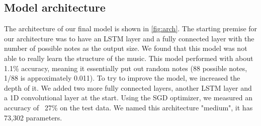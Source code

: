 \documentclass[11pt, twocolumn]{article}
\begin{document}
\subsection{Model architecture}\label{architecture}
The architecture of our final model is shown in \autoref{fig:arch}. The starting premise for our architecture was to have an LSTM layer and a fully connected layer with the number of possible notes as the output size. We found that this model was not able to really learn the structure of the music. This model performed with about 1.1\% accuracy, meaning it essentially put out random notes (88 possible notes, 1/88 is approximately 0.011). To try to improve the model, we increased the depth of it. We added two more fully connected layers, another LSTM layer and a 1D convolutional layer at the start. Using the SGD optimizer, we measured an accuracy of ~27\% on the test data. We named this architecture "medium", it has 73,302 parameters.
\end{document}
